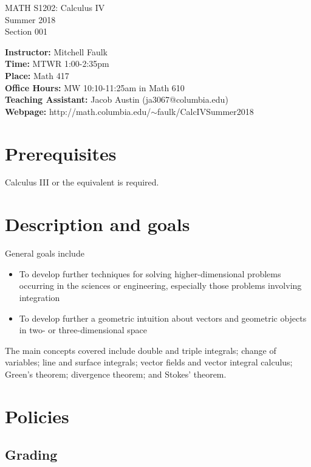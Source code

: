 \documentclass{article}
\begin{document}
\begin{center}
MATH S1202: Calculus IV \\
Summer 2018 \\
Section 001
\end{center}


\noindent \textbf{Instructor:} Mitchell Faulk \\
\textbf{Time:} MTWR 1:00-2:35pm  \\
\textbf{Place:} Math 417 \\
\textbf{Office Hours:} MW 10:10-11:25am in Math 610 \\
\textbf{Teaching Assistant:} Jacob Austin (ja3067@columbia.edu) \\
\textbf{Webpage:} http://math.columbia.edu/$\sim$faulk/CalcIVSummer2018

\section*{Prerequisites}

Calculus III or the equivalent is required. 

\section*{Description and goals}



General goals include 
\begin{itemize}
\item To develop further techniques for solving higher-dimensional problems occurring in the sciences or engineering, especially those problems involving integration
\item To develop further a geometric intuition about vectors and geometric objects in two- or three-dimensional space
\end{itemize}
The main concepts covered include double and triple integrals; change of variables; line and surface integrals; vector fields and vector integral calculus; Green's theorem; divergence theorem; and Stokes' theorem. 




\section*{Policies}

\subsection*{Grading}
\end{document}

